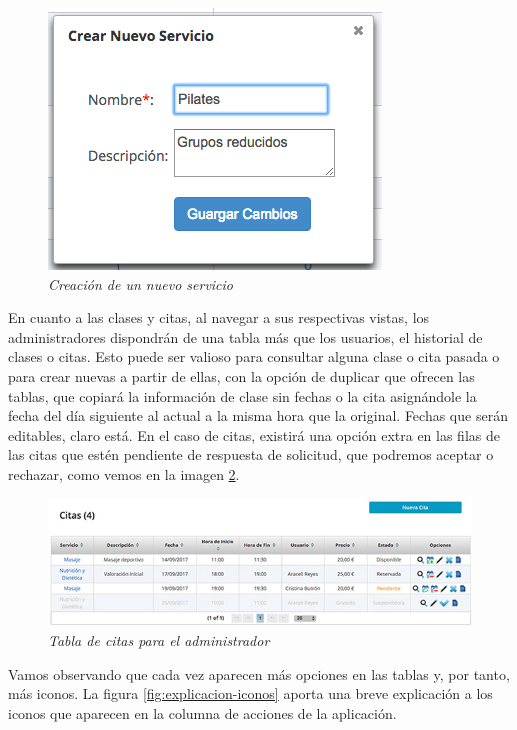 \begin{figure}
\centering
  \includegraphics[scale=.70]{img/manual/crear-nuevo-servicio.jpg}
  \caption{\textit{Creación de un nuevo servicio}}
  \label{fig:nuevo-servicio}
\end{figure}

En cuanto a las clases y citas, al navegar a sus respectivas vistas, los administradores dispondrán de una tabla más que los usuarios, el historial de clases o citas. Esto puede ser valioso para consultar alguna clase o cita pasada o para crear nuevas a partir de ellas, con la opción de duplicar que ofrecen las tablas, que copiará la información de clase sin fechas o la cita asignándole la fecha del día siguiente al actual a la misma hora que la original. Fechas que serán editables, claro está. En el caso de citas, existirá una opción extra en las filas de las citas que estén pendiente de respuesta de solicitud, que podremos aceptar o rechazar, como vemos en la imagen \ref{fig:tabla-citas-admin}. \\

\begin{figure}
\centering
  \includegraphics[scale=.70]{img/manual/tabla-citas-admin.jpg}
  \caption{\textit{Tabla de citas para el administrador}}
  \label{fig:tabla-citas-admin}
\end{figure}

Vamos observando que cada vez aparecen más opciones en las tablas y, por tanto, más iconos. La figura \ref{fig:explicacion-iconos} aporta una breve explicación a los iconos que aparecen en la columna de acciones de la aplicación. 

